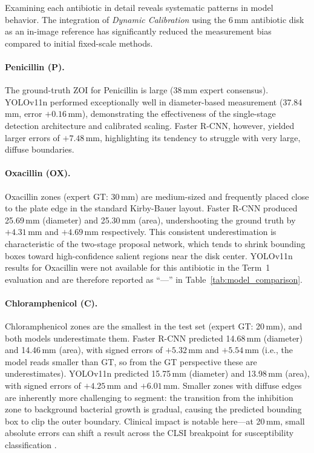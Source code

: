 Examining each antibiotic in detail reveals systematic patterns in model behavior. The integration of \emph{Dynamic Calibration} using the 6\,mm antibiotic disk as an in-image reference has significantly reduced the measurement bias compared to initial fixed-scale methods.

\paragraph{Penicillin (P).}
The ground-truth ZOI for Penicillin is large (38\,mm expert consensus).
YOLOv11n performed exceptionally well in diameter-based measurement (37.84\,mm, error $+0.16$\,mm), demonstrating the effectiveness of the single-stage detection architecture and calibrated scaling. Faster R-CNN, however, yielded larger errors of $+7.48$\,mm, highlighting its tendency to struggle with very large, diffuse boundaries.

\paragraph{Oxacillin (OX).}
Oxacillin zones (expert GT: 30\,mm) are medium-sized and frequently placed close
to the plate edge in the standard Kirby-Bauer layout.
Faster R-CNN produced 25.69\,mm (diameter) and 25.30\,mm (area),
undershooting the ground truth by $+4.31$\,mm and $+4.69$\,mm respectively.
This consistent underestimation is characteristic of the two-stage proposal network,
which tends to shrink bounding boxes toward high-confidence salient regions near the disk center.
YOLOv11n results for Oxacillin were not available for this antibiotic in the Term~1 evaluation
and are therefore reported as ``---'' in Table~\ref{tab:model_comparison}.

\paragraph{Chloramphenicol (C).}
Chloramphenicol zones are the smallest in the test set (expert GT: 20\,mm),
and both models underestimate them.
Faster R-CNN predicted 14.68\,mm (diameter) and 14.46\,mm (area),
with signed errors of $+5.32$\,mm and $+5.54$\,mm (i.e., the model reads smaller than GT,
so from the GT perspective these are underestimates).
YOLOv11n predicted 15.75\,mm (diameter) and 13.98\,mm (area),
with signed errors of $+4.25$\,mm and $+6.01$\,mm.
Smaller zones with diffuse edges are inherently more challenging to segment:
the transition from the inhibition zone to background bacterial growth is gradual,
causing the predicted bounding box to clip the outer boundary.
Clinical impact is notable here---at 20\,mm, small absolute errors can shift
a result across the CLSI breakpoint for susceptibility classification \cite{clsi2025}.

